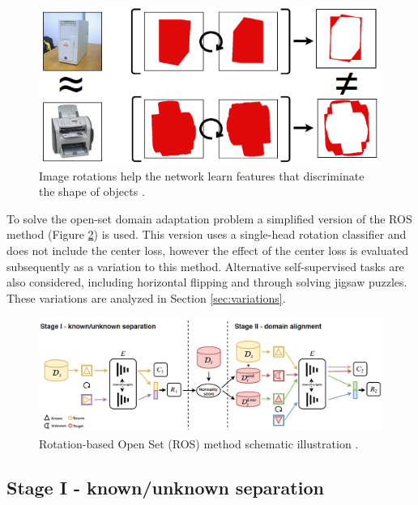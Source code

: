 \documentclass[10pt,twocolumn,letterpaper]{article}
\begin{document}
\begin{figure}[!htb]
  \centering
   \includegraphics[width=0.9\linewidth]{Figures/RotationFeatures.png}
   \caption{Image rotations help the network learn features that discriminate the shape of objects \cite{Bucci2020}.}
   \label{fig:RotationFeatures}
\end{figure}

To solve the open-set domain adaptation problem a simplified version of the ROS method (Figure \ref{fig:ROS}) is used. This version uses a single-head rotation classifier and does not include the center loss, however the effect of the center loss is evaluated subsequently as a variation to this method. Alternative self-supervised tasks are also considered, including horizontal flipping and through solving jigsaw puzzles. These variations are analyzed in Section \ref{sec:variations}.

\begin{figure}[!htb]
  \centering
   \includegraphics[width=0.9\linewidth]{Figures/ROS.png}
   \caption{Rotation-based Open Set (ROS) method schematic illustration \cite{Bucci2020}.}
   \label{fig:ROS}
\end{figure}

\subsection{Stage I - known/unknown separation}
\end{document}
